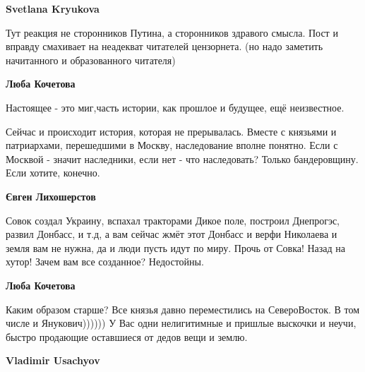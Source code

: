 \begin{itemize}
\begin{itemize}
\textbf{Svetlana Kryukova} 

Тут реакция не сторонников Путина, а сторонников здравого смысла. Пост и
вправду смахивает на неадекват читателей цензорнета. (но надо заметить
начитанного и образованного читателя)

 
\textbf{Люба Кочетова} 

Настоящее - это миг,часть истории, как прошлое и будущее, ещё неизвестное.

Сейчас и происходит история, которая не прерывалась. Вместе с князьями и
патриархами, перешедшими в Москву, наследование вполне понятно. Если с Москвой
- значит наследники, если нет - что наследовать? Только бандеровщину. Если
хотите, конечно.


 
\textbf{Євген Лихошерстов} 

Совок создал Украину, вспахал тракторами Дикое поле, построил Днепрогэс, развил
Донбасс, и т.д, а вам сейчас жмёт этот Донбасс и верфи Николаева и земля вам не
нужна, да и люди пусть идут по миру. Прочь от Совка! Назад на хутор! Зачем вам
все созданное? Недостойны.

 
\textbf{Люба Кочетова} 

Каким образом старше? Все князья давно переместились на СевероВосток. В том
числе и Янукович)))))) У Вас одни нелигитимные и пришлые выскочки и неучи,
быстро продающие оставшиеся от дедов вещи и землю.

 
\textbf{Vladimir Usachyov} 


\end{itemize}
\end{itemize}
